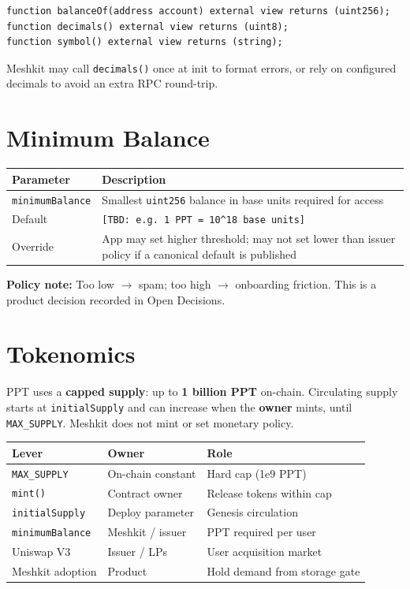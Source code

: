 \documentclass[11pt,a4paper,openany]{report}
\begin{document}
\begin{lstlisting}[language={}]
function balanceOf(address account) external view returns (uint256);
function decimals() external view returns (uint8);
function symbol() external view returns (string);
\end{lstlisting}

Meshkit may call \texttt{decimals()} once at init to format errors, or rely on configured decimals to avoid an extra RPC round-trip.

\section{Minimum Balance}

\begin{center}
\begin{tabular}{@{}lp{9cm}@{}}
\toprule
\textbf{Parameter} & \textbf{Description} \\
\midrule
\texttt{minimumBalance} & Smallest \texttt{uint256} balance in base units required for access \\
Default & \texttt{[TBD: e.g.\ 1 PPT = 10\textasciicircum 18 base units]} \\
Override & App may set higher threshold; may not set lower than issuer policy if a canonical default is published \\
\bottomrule
\end{tabular}
\end{center}

\textbf{Policy note:} Too low $\rightarrow$ spam; too high $\rightarrow$ onboarding friction. This is a product decision recorded in Open Decisions.

\section{Tokenomics}

PPT uses a \textbf{capped supply}: up to \textbf{1 billion PPT} on-chain. Circulating supply starts at \texttt{initialSupply} and can increase when the \textbf{owner} mints, until \texttt{MAX\_SUPPLY}. Meshkit does not mint or set monetary policy.

\begin{center}
\small
\begin{tabular}{@{}llp{7.5cm}@{}}
\toprule
\textbf{Lever} & \textbf{Owner} & \textbf{Role} \\
\midrule
\texttt{MAX\_SUPPLY} & On-chain constant & Hard cap (1e9 PPT) \\
\texttt{mint()} & Contract owner & Release tokens within cap \\
\texttt{initialSupply} & Deploy parameter & Genesis circulation \\
\texttt{minimumBalance} & Meshkit / issuer & PPT required per user \\
Uniswap V3 & Issuer / LPs & User acquisition market \\
Meshkit adoption & Product & Hold demand from storage gate \\
\bottomrule
\end{tabular}
\end{center}
\end{document}
